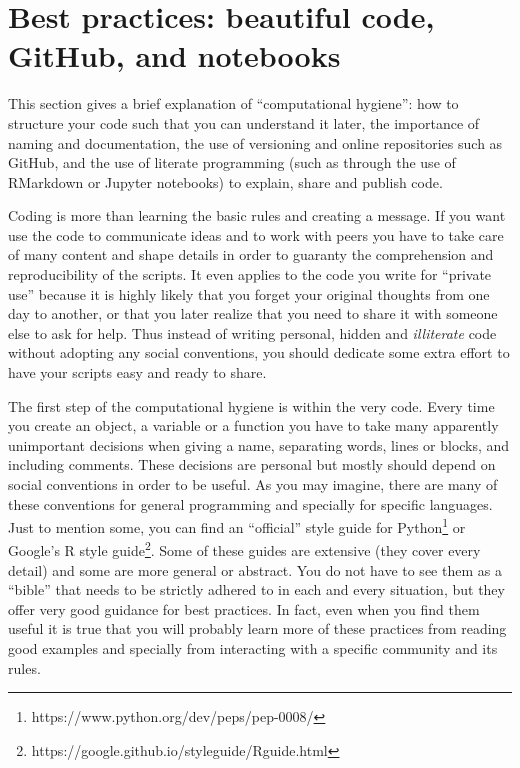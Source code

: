 \section{Best practices: beautiful code, GitHub, and notebooks}
\label{sec:practices}


This section gives a brief explanation of ``computational hygiene'': how to structure your code such that you can understand it later, the importance of naming and documentation, the use of versioning and online repositories such as GitHub, and the use of literate programming (such as through the use of RMarkdown or Jupyter notebooks) to explain, share and publish code.

Coding is more than learning the basic rules and creating a message. If you want use the code to communicate ideas and to work with peers you have to take care of many content and shape details in order to guaranty the comprehension and reproducibility of the scripts. It even applies to the code you write for ``private use'' because it is highly likely that you forget your original thoughts from one day to another, or that you later realize that you need to share it with someone else to ask for help. Thus instead of writing personal, hidden and \textit{illiterate} code without adopting any social conventions, you should dedicate some extra effort to have your scripts easy and ready to share.

The first step of the computational hygiene is within the very code. Every time you create an object, a variable or a function you have to take many apparently unimportant decisions when giving a name, separating words, lines or blocks, and including comments. These decisions are personal but mostly should depend on social conventions in order to be useful. As you may imagine, there are many of these conventions for general programming and specially for specific languages. Just to mention some, you can find an ``official'' style guide for Python\footnote{https://www.python.org/dev/peps/pep-0008/}  or Google's R style guide\footnote{https://google.github.io/styleguide/Rguide.html}. Some of these guides are extensive (they cover every detail) and some are more general or abstract. You do not have to see them as a ``bible'' that needs to be strictly adhered to in each and every situation, but they offer very good guidance for best practices. In fact, even when you find them useful it is true that you will probably learn more of these practices from reading good examples and specially from interacting with a specific community and its rules.

